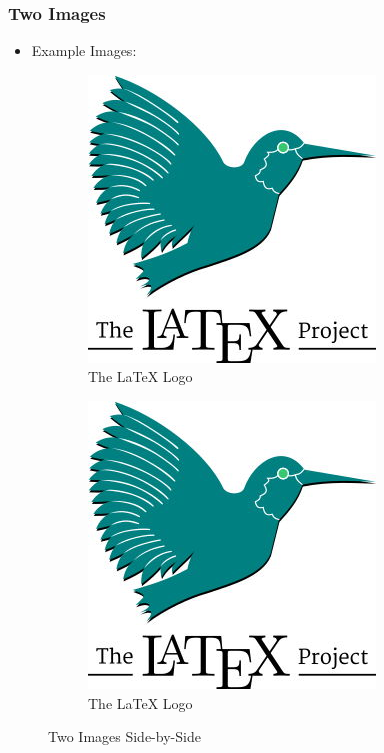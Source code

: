 		\subsubsection{Two Images}
			\begin{itemize}
				\item Example Images:
			\end{itemize}
			\begin{figure}[h!]
				\centering
				\begin{subfigure}[b]{0.4\linewidth}
					\includegraphics[width=0.8\linewidth]{images/LaTeXLogo.jpg}
					\caption{The \LaTeX{} Logo}
				\end{subfigure}
				\begin{subfigure}[b]{0.4\linewidth}
					\includegraphics[width=0.8\linewidth]{images/LaTeXLogo.jpg}
					\caption{The \LaTeX{} Logo}
				\end{subfigure}
				\caption{Two Images Side-by-Side}
			\end{figure}
